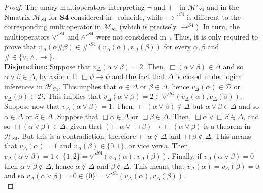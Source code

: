 \documentclass[12pt]{article}
\begin{document}
\begin{proof}
The unary multioperators interpreting $\neg$ and $\Box$ in $\mathcal{M}'_{S4}$ and in the Nmatrix  $\mathcal{M}_{S4}$ for \textbf{S4} considered in~\cite{gratz_truth_2022} coincide, while $\to'^{S4}$ is different to the corresponding multioperator in $\mathcal{M}_{S4}$  (which is precisely $\to^{S4}$). In turn, the multioperators $\lor'^{S4}$ and $\land'^{S4}$ were not considered in~\cite[Lemma~3.7]{gratz_truth_2022}. Thus, it is only required to prove that $v_\Delta(\alpha \# \beta) \in \#'^{S4}(v_\Delta(\alpha),v_\Delta(\beta))$ for every $\alpha,\beta$ and $\# \in \{\lor,\land,\to\}$.\\[1mm]
{\bf Disjunction:} Suppose that $v_\Delta(\alpha \vee \beta)=2$. Then, $\Box(\alpha \vee \beta) \in \Delta$ and so $\alpha \vee \beta \in \Delta$, by axiom T: $\Box \psi \to \psi$ and the fact that $\Delta$ is closed under logical inferences in $\mathcal{H}_{S4}$. This implies that $\alpha \in \Delta$ or $\beta \in \Delta$, hence $v_\Delta(\alpha)  \in \mathcal{D}$ or $v_\Delta(\beta) \in \mathcal{D}$. This implies that $v_\Delta(\alpha \vee \beta)=2 \in  \vee'^{S4}(v_\Delta(\alpha),v_\Delta(\beta))$. Suppose now that $v_\Delta(\alpha \vee \beta)=1$. Then, $\Box(\alpha \vee \beta) \notin \Delta$ but $\alpha \vee \beta \in \Delta$ and so $\alpha \in \Delta$ or $\beta \in \Delta$. Suppose that $\Box\alpha \in \Delta$ or $\Box\beta \in \Delta$. Then, $\Box\alpha \vee \Box\beta \in \Delta$, and so  $\Box(\alpha \vee \beta) \in \Delta$, given that $(\Box\alpha \vee \Box\beta) \to \Box(\alpha \vee \beta)$ is a theorem in  $\mathcal{H}_{S4}$. But this is a contradiction, therefore $\Box\alpha \notin \Delta$ and $\Box\beta \notin \Delta$. This means that $v_\Delta(\alpha)=1$ and $v_\Delta(\beta) \in \{0,1\}$, or vice versa.  Then, $v_\Delta(\alpha \vee \beta)=1 \in  \{1,2\}=\vee'^{S4}(v_\Delta(\alpha),v_\Delta(\beta))$. Finally, if $v_\Delta(\alpha \vee \beta)=0$ then $\alpha \vee \beta \notin \Delta$, hence $\alpha \notin \Delta$ and $\beta \notin \Delta$. This means that $v_\Delta(\alpha)=v_\Delta(\beta)=0$ and so $v_\Delta(\alpha \vee \beta)=0 \in  \{0\}=\vee'^{S4}(v_\Delta(\alpha),v_\Delta(\beta))$.\\[1mm]

\end{proof}
\end{document}
